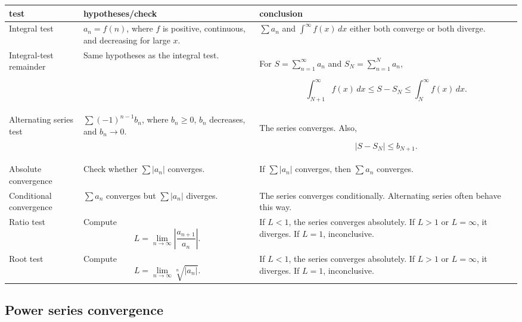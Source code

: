 \begin{center}
\small
\renewcommand{\arraystretch}{2.0}
\begin{tabular}{p{}|p{}|p{}}
\textbf{test} & \textbf{hypotheses/check} & \textbf{conclusion} \\ \hline

Integral test &
\(a_n=f(n)\), where \(f\) is positive, continuous, and decreasing for large \(x\). &
\(\displaystyle \sum a_n\) and \(\displaystyle \int^\infty f(x)\,dx\) either both
converge or both diverge. \\

Integral-test remainder &
Same hypotheses as the integral test. &
For \(S=\sum_{n=1}^{\infty}a_n\) and \(S_N=\sum_{n=1}^{N}a_n\),

\[
\int_{N+1}^{\infty}f(x)\,dx
\le
S-S_N
\le
\int_N^{\infty}f(x)\,dx.
\] \\

Alternating series test &
\(\displaystyle \sum (-1)^{n-1}b_n\), where \(b_n\ge0\), \(b_n\) decreases, and
\(b_n\to0\). &
The series converges.  Also,

\[
|S-S_N|\le b_{N+1}.
\] \\

Absolute convergence &
Check whether \(\displaystyle \sum |a_n|\) converges. &
If \(\sum |a_n|\) converges, then \(\sum a_n\) converges. \\

Conditional convergence &
\(\displaystyle \sum a_n\) converges but \(\displaystyle \sum |a_n|\) diverges. &
The series converges conditionally.  Alternating series often behave this way. \\

Ratio test &
Compute
\[
L=\lim_{n\to\infty}\left|\frac{a_{n+1}}{a_n}\right|.
\] &
If \(L<1\), the series converges absolutely.
If \(L>1\) or \(L=\infty\), it diverges.
If \(L=1\), inconclusive. \\

Root test &
Compute
\[
L=\lim_{n\to\infty}\sqrt[n]{|a_n|}.
\] &
If \(L<1\), the series converges absolutely.
If \(L>1\) or \(L=\infty\), it diverges.
If \(L=1\), inconclusive.
\end{tabular}
\end{center}

\subsection{Power series convergence}
\label{appsubsec:power-series-tests-table}

